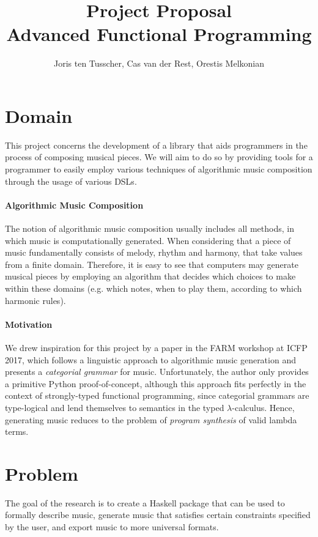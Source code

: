 \documentclass[10pt,a4paper]{article}
\title{\textbf{Project Proposal \\ \small{Advanced Functional Programming}}}
\author{\small{Joris ten Tusscher, Cas van der Rest, Orestis Melkonian}}
\date{}
\begin{document}
\maketitle

\section{Domain}
This project concerns the development of a library that aids programmers in the process of composing musical pieces. We will aim to do so by providing tools for a programmer to easily employ various techniques of algorithmic music composition through the usage of various DSLs. 
\vspace{-10pt}
\paragraph{Algorithmic Music Composition}
The notion of algorithmic music composition usually includes all methods, in which music is computationally generated. When considering that a piece of music fundamentally consists of melody, rhythm and harmony, that take values from a finite domain. Therefore, it is easy to see that computers may generate musical pieces by employing an algorithm that decides which choices to make within these domains (e.g. which notes, when to play them, according to which harmonic rules).
\vspace{-10pt}
\paragraph{Motivation}
We drew inspiration for this project by a paper in the FARM workshop at ICFP 2017\cite{categorial}, which follows a linguistic approach to algorithmic music generation and presents a \textit{categorial grammar} for music. Unfortunately, the author only provides a primitive Python proof-of-concept, although this approach fits perfectly in the context of strongly-typed functional programming, since categorial grammars are type-logical and lend themselves to semantics in the typed $\lambda$-calculus. Hence, generating music reduces to the problem of \textit{program synthesis} of valid lambda terms.

\section{Problem}
The goal of the research is to create a Haskell package that can be used to formally describe music, generate music that satisfies certain constraints specified by the user, and export music to more universal formats.
\end{document}
